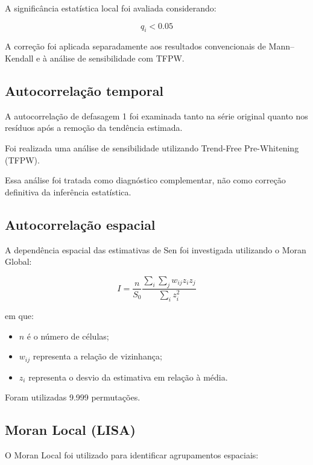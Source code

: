 \documentclass[12pt,a4paper]{article}
\begin{document}
A significância estatística local foi avaliada
considerando:

\begin{equation}
q_i < 0.05
\end{equation}

A correção foi aplicada separadamente aos resultados
convencionais de Mann--Kendall e à análise de
sensibilidade com TFPW.

\subsection{Autocorrelação temporal}

A autocorrelação de defasagem 1 foi examinada
tanto na série original quanto nos resíduos após
a remoção da tendência estimada.

Foi realizada uma análise de sensibilidade utilizando
Trend-Free Pre-Whitening (TFPW).

Essa análise foi tratada como diagnóstico complementar,
não como correção definitiva da inferência estatística.

\subsection{Autocorrelação espacial}

A dependência espacial das estimativas de Sen foi
investigada utilizando o Moran Global:

\begin{equation}
I =
\frac{n}{S_0}
\frac{
\sum_i \sum_j w_{ij} z_i z_j
}{
\sum_i z_i^2
}
\end{equation}

em que:

\begin{itemize}
    \item $n$ é o número de células;
    \item $w_{ij}$ representa a relação de vizinhança;
    \item $z_i$ representa o desvio da estimativa em
    relação à média.
\end{itemize}

Foram utilizadas 9.999 permutações.

\subsection{Moran Local (LISA)}

O Moran Local foi utilizado para identificar
agrupamentos espaciais:
\end{document}
